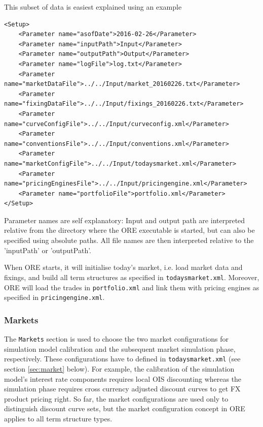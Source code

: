 \documentclass[12pt, a4paper]{article}
\begin{document}
This subset of data is easiest explained using an example

\begin{lstlisting}[caption={ORE setup example},
 	label=lst:ore_setup]
<Setup>    
	<Parameter name="asofDate">2016-02-26</Parameter>
	<Parameter name="inputPath">Input</Parameter>
	<Parameter name="outputPath">Output</Parameter>
	<Parameter name="logFile">log.txt</Parameter>
	<Parameter name="marketDataFile">../../Input/market_20160226.txt</Parameter>
	<Parameter name="fixingDataFile">../../Input/fixings_20160226.txt</Parameter>
	<Parameter name="curveConfigFile">../../Input/curveconfig.xml</Parameter>
	<Parameter name="conventionsFile">../../Input/conventions.xml</Parameter>
	<Parameter name="marketConfigFile">../../Input/todaysmarket.xml</Parameter>
	<Parameter name="pricingEnginesFile">../../Input/pricingengine.xml</Parameter>
	<Parameter name="portfolioFile">portfolio.xml</Parameter>
</Setup>
\end{lstlisting}

Parameter names are self explanatory: Input and output path are interpreted relative from the directory where the ORE executable is started, but can also be specified using absolute paths. All file names are then interpreted relative to the 'inputPath' or 'outputPath'. 

When ORE starts, it will initialise today's market, i.e. load market data and fixings, and build all term structures as specified in {\tt todaysmarket.xml}. 
Moreover, ORE will load the trades in {\tt portfolio.xml} and link them with pricing engines as specified in {\tt pricingengine.xml}.    

\subsubsection*{Markets}

The {\tt Markets} section is used to choose the two market configurations for simulation model calibration and the subsequent market simulation phase, respectively. These configurations have to defined in {\tt todaysmarket.xml} (see section \ref{sec:market} below). For example, the calibration of the simulation model's interest rate components requires local OIS discounting whereas the simulation phase requires cross currency adjusted discount curves to get FX product pricing right. So far, the market configurations are used only to distinguish discount curve sets, but the market configuration concept in ORE applies to all term structure types.
\end{document}
